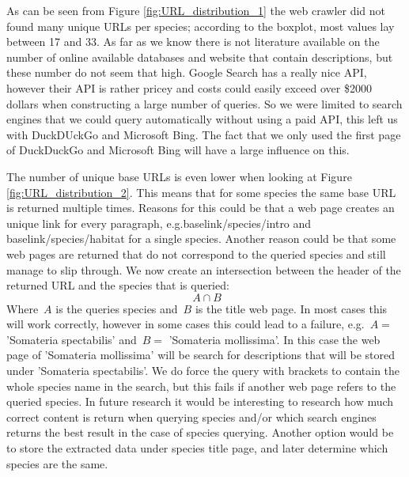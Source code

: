 \documentclass[a4paper, 12pt, oneside]{book} %
\begin{document}
As can be seen from Figure \ref{fig:URL_distribution_1} the web crawler did not found many unique URLs per species; according to the boxplot, most values lay between 17 and 33.
As far as we know there is not literature available on the number of online available databases and website that contain descriptions, but these number do not seem that high.
Google Search has a really nice API, however their API is rather pricey and costs could easily exceed over \$2000 dollars when constructing a large number of queries. 
So we were limited to search engines that we could query automatically without using a paid API, this left us with DuckDUckGo and Microsoft Bing.
The fact that we only used the first page of DuckDuckGo and Microsoft Bing will have a large influence on this.




The number of unique base URLs is even lower when looking at Figure \ref{fig:URL_distribution_2}.
This means that for some species the same base URL is returned multiple times. 
Reasons for this could be that a web page creates an unique link for every paragraph, e.g.baselink/species/intro and baselink/species/habitat for a single species.
Another reason could be that some web pages are returned that do not correspond to the queried species and still manage to slip through.
We now create an intersection between the header of the returned URL and the species that is queried:
\begin{equation} \label{eq:intersection}
    ~A \cap B
\end{equation}
Where~$A$ is the queries species and~$B$ is the title web page.
In most cases this will work correctly, however in some cases this could lead to a failure, e.g.~$A = $ 'Somateria spectabilis' and~$B = $ 'Somateria mollissima'.
In this case the web page of 'Somateria mollissima' will be search for descriptions that will be stored under 'Somateria spectabilis'. 
We do force the query with brackets to contain the whole species name in the search, but this fails if another web page refers to the queried species.
In future research it would be interesting to research how much correct content is return when querying species and/or which search engines returns the best result in the case of species querying.
Another option would be to store the extracted data under species title page, and later determine which species are the same.
\end{document}

